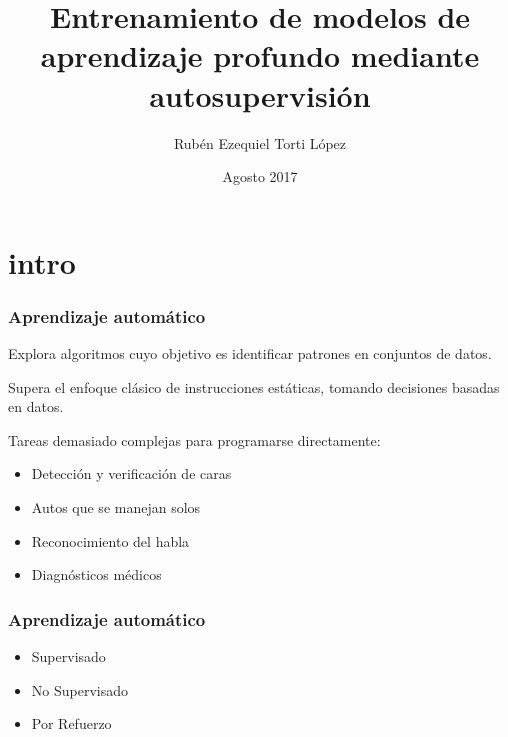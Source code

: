 \documentclass{beamer}
\title{Entrenamiento de modelos de aprendizaje profundo mediante autosupervisión}
\author
{Rubén Ezequiel Torti López}
\institute
{
  Facultad de Matemática, Astronomía, Física y Computación\\
  Universidad Nacional de Córdoba
}
\date
{Agosto 2017}
\begin{document}
\frame{\titlepage}




\section{intro}
\begin{frame}
\frametitle{Aprendizaje automático}
Explora algoritmos cuyo objetivo es identificar patrones en conjuntos de datos.\pause
\vfill

Supera el enfoque clásico de instrucciones estáticas, tomando decisiones basadas en datos.\pause
\vfill

Tareas demasiado complejas para programarse directamente:
\vfill

\begin{itemize}
	\item Detección y verificación de caras
	\item Autos que se manejan solos 
        \item Reconocimiento del habla
        \item Diagnósticos médicos 
\end{itemize}
\end{frame}





\begin{frame}
\frametitle{Aprendizaje automático}
\vfill
\begin{itemize}
	\item<1-> Supervisado 
	\item<2-> No Supervisado 
        \item<3-> Por Refuerzo 
\end{itemize}
\vfill
\end{frame}

\end{document}
